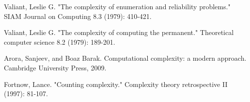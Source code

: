 \documentclass[paper=a4, fontsize=11pt]{scrartcl} %
\numberwithin{equation}{section} %
\numberwithin{figure}{section} %
\numberwithin{table}{section} %
\numberwithin{definition}{section}
\numberwithin{theorem}{section}
\begin{document}
\pagebreak
\begin{thebibliography}{1}

 Valiant, Leslie G. "The complexity of enumeration and reliability problems." SIAM Journal on Computing 8.3 (1979): 410-421.

 Valiant, Leslie G. "The complexity of computing the permanent." Theoretical computer science 8.2 (1979): 189-201.

 Arora, Sanjeev, and Boaz Barak. Computational complexity: a modern approach. Cambridge University Press, 2009.

 Fortnow, Lance. "Counting complexity." Complexity theory retrospective II (1997): 81-107.

\end{thebibliography}
\end{document}
